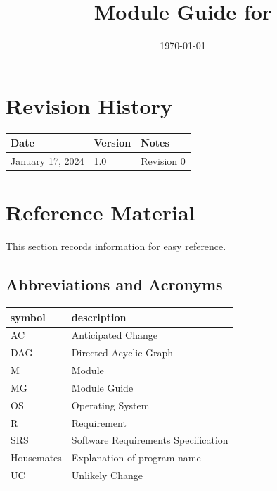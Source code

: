\documentclass[12pt, titlepage]{article}
\begin{document}
\title{Module Guide for \progname{}} 
\author{\authname}
\date{\today}

\maketitle


\section{Revision History}

\begin{tabularx}{\textwidth}{p{3cm}p{2cm}X}
\toprule {\bf Date} & {\bf Version} & {\bf Notes}\\
\midrule
January 17, 2024 & 1.0 & Revision 0\\
\bottomrule
\end{tabularx}

\newpage

\section{Reference Material}

This section records information for easy reference.

\subsection{Abbreviations and Acronyms}

\renewcommand{\arraystretch}{1.2}
\begin{tabular}{l l} 
  \toprule		
  \textbf{symbol} & \textbf{description}\\
  \midrule 
  AC & Anticipated Change\\
  DAG & Directed Acyclic Graph \\
  M & Module \\
  MG & Module Guide \\
  OS & Operating System \\
  R & Requirement\\
  SRS & Software Requirements Specification\\
  Housemates & Explanation of program name\\
  UC & Unlikely Change \\
  \bottomrule
\end{tabular}\\

\newpage
\end{document}

